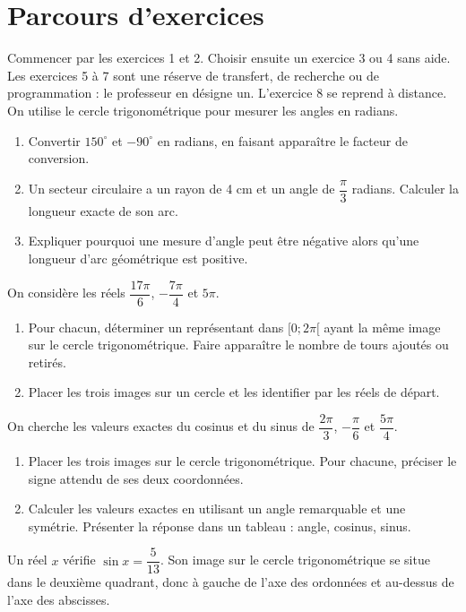 \section*{Parcours d’exercices}\label{C10-PARC}
Commencer par les exercices 1 et 2. Choisir ensuite un exercice 3 ou 4 sans aide. Les exercices 5 à 7 sont une réserve de transfert, de recherche ou de programmation : le professeur en désigne un. L’exercice 8 se reprend à distance.
\begingroup
{}
On utilise le cercle trigonométrique pour mesurer les angles en radians.
\begin{enumerate}[label=\arabic*.]
\item Convertir $150^\circ$ et $-90^\circ$ en radians, en faisant apparaître le facteur de conversion.
\item Un secteur circulaire a un rayon de 4 cm et un angle de $\dfrac\pi3$ radians. Calculer la longueur exacte de son arc.
\item Expliquer pourquoi une mesure d’angle peut être négative alors qu’une longueur d’arc géométrique est positive.
\end{enumerate}
On considère les réels $\dfrac{17\pi}{6}$, $-\dfrac{7\pi}{4}$ et $5\pi$.
\begin{enumerate}[label=\arabic*.]
\item Pour chacun, déterminer un représentant dans $[0;2\pi[$ ayant la même image sur le cercle trigonométrique. Faire apparaître le nombre de tours ajoutés ou retirés.
\item Placer les trois images sur un cercle et les identifier par les réels de départ.
\end{enumerate}
On cherche les valeurs exactes du cosinus et du sinus de $\dfrac{2\pi}{3}$, $-\dfrac\pi6$ et $\dfrac{5\pi}{4}$.
\begin{enumerate}[label=\arabic*.]
\item Placer les trois images sur le cercle trigonométrique. Pour chacune, préciser le signe attendu de ses deux coordonnées.
\item Calculer les valeurs exactes en utilisant un angle remarquable et une symétrie. Présenter la réponse dans un tableau : angle, cosinus, sinus.
\end{enumerate}
Un réel $x$ vérifie $\sin x=\dfrac5{13}$. Son image sur le cercle trigonométrique se situe dans le deuxième quadrant, donc à gauche de l’axe des ordonnées et au-dessus de l’axe des abscisses.
